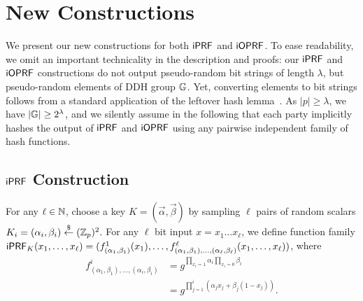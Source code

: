 \section{New Constructions}
We present our new constructions for both $\mathsf{i}\mathsf{PRF}$ and $\mathsf{i}\mathsf{OPRF}$.  To
ease readability, we omit an important technicality in the description
and proofs: our $\mathsf{i}\mathsf{PRF}$ and $\mathsf{i}\mathsf{OPRF}$ constructions do not output
pseudo-random bit strings of length $\lambda$, but pseudo-random
elements of DDH group $\mathbb{G}$. Yet, converting elements to bit strings
follows from a standard application of the leftover hash
lemma~\cite{leftover}. As $|p|\geq\lambda$, we have
$|\mathbb{G}|\ge{}2^\lambda$, and we silently assume in the following that
each party implicitly hashes the output of $\mathsf{i}\mathsf{PRF}$ and $\mathsf{i}\mathsf{OPRF}$ using
any pairwise independent family of hash functions.


\subsection{$\mathsf{i}\mathsf{PRF}$ Construction}
\label{sec:newprf}
\begin{construction}
  \label{const:newprf}
For any $\ell\in{\mathbb{N}}$, choose a key $K=(\vec{{\alpha}},\vec{\beta})$ by
sampling $\ell$ pairs of random scalars
$K_i=({\alpha_{i}},{\beta_{i}})\stackrel{\$}{\leftarrow}{}(\mathbb{Z}_p)^2.$ For any $\ell$ bit
input $x=x_1\ldots{}x_\ell$, we define function family
$\mathsf{i}\mathsf{PRF}_K(x_1,\ldots,x_\ell)=(f^1_{(\alpha_1,\beta_1)}(x_1),\ldots,f^\ell_{(\alpha_1,\beta_1),\ldots,(\alpha_\ell,\beta_\ell)}(x_1,\ldots,x_\ell))$,
where
\begin{align*}
f^i_{(\alpha_1,\beta_1),\ldots,(\alpha_i,\beta_i)} &=
g^{\prod_{x_i=1}\alpha_i \prod_{x_i=0}\beta_i}\\&=
g^{\prod_{j=1}^{i} (\alpha_jx_j+\beta_j(1-x_j))}.
\end{align*}
 
 \end{construction}

